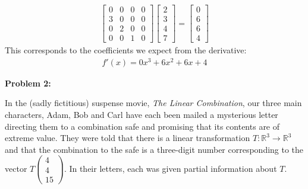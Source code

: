 \documentclass[10pt,letterpaper,final]{report}
\begin{document}
\begin{enumerate}[label=(\alph*)]
\begin{align*}
\begin{bmatrix}
            0 & 0 & 0 & 0 \\
            3 & 0 & 0 & 0 \\
            0 & 2 & 0 & 0 \\
            0 & 0 & 1 & 0
          \end{bmatrix}
          \begin{bmatrix}
            2 \\
            3 \\
            4 \\
            7
          \end{bmatrix}
          = \begin{bmatrix}
              0 \\
              6 \\
              6 \\
              4
            \end{bmatrix}
        \end{align*}
        This corresponds to the coefficients we expect from the derivative:
        \begin{align*}
          f'(x) = 0x^3 + 6x^2 + 6x + 4
        \end{align*}
\end{enumerate}

\pagebreak

\noindent\textbf{Problem 2:}
\medskip

In the (sadly fictitious) suspense movie, \emph{The Linear Combination}, our three main characters, Adam, Bob and Carl have each been mailed a mysterious letter directing them to a combination safe and promising that its contents are of extreme value. They were told that there is a linear transformation $T: \mathbb{R}^3 \to \mathbb{R}^3$ and that the combination to the safe is a three-digit number corresponding to the vector $T\begin{pmatrix}4\\4\\15\end{pmatrix}$. In their letters, each was given partial information about $T$.
\end{document}
